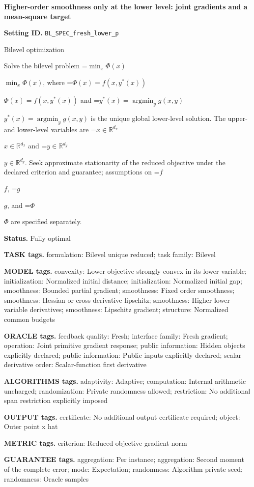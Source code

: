 \documentclass[10pt,a4paper]{article}
\newcommand{\AtlasMath}[1]{\par\begingroup\centering\setbox0=\hbox{$\displaystyle #1$}\ifdim\wd0>1.4\linewidth\typeout{ATLAS WIDE FORMULA: \the\wd0}\fi\ifdim\wd0>\linewidth\resizebox{\linewidth}{!}{\box0}\else\box0\fi\par\endgroup}
\newcommand{\AtlasInlineMath}[1]{\begingroup\setbox0=\hbox{$#1$}\ifdim\wd0>.4\linewidth\endgroup\AtlasMath{#1}\else\endgroup$#1$\fi}
\begin{document}
\raggedright

{\LARGE\bfseries\sffamily\color{AtlasNavy} Higher-order smoothness only at the lower level: joint gradients and a mean-square target\par}\vspace{5pt}
\textbf{Setting ID.} \texttt{BL\_\allowbreak{}SPEC\_\allowbreak{}fresh\_\allowbreak{}lower\_\allowbreak{}p}

Bilevel optimization

Solve the bilevel problem \AtlasInlineMath{\min_x\Phi(x)}, where \AtlasInlineMath{\Phi(x)=f(x,y^*(x))} and \AtlasInlineMath{y^*(x)=\operatorname*{argmin}_y g(x,y)} is the unique global lower-level solution. The upper- and lower-level variables are \AtlasInlineMath{x\in\mathbb{R}^{d_x}} and \AtlasInlineMath{y\in\mathbb{R}^{d_y}}. Seek approximate stationarity of the reduced objective under the declared criterion and guarantee; assumptions on \AtlasInlineMath{f}, \AtlasInlineMath{g}, and \AtlasInlineMath{\Phi} are specified separately.

\textbf{Status.} Fully optimal

\textbf{TASK tags.} formulation: Bilevel unique reduced; task family: Bilevel

\textbf{MODEL tags.} convexity: Lower objective strongly convex in its lower variable; initialization: Normalized initial distance; initialization: Normalized initial gap; smoothness: Bounded partial gradient; smoothness: Fixed order smoothness; smoothness: Hessian or cross derivative lipschitz; smoothness: Higher lower variable derivatives; smoothness: Lipschitz gradient; structure: Normalized common budgets

\textbf{ORACLE tags.} feedback quality: Fresh; interface family: Fresh gradient; operation: Joint primitive gradient response; public information: Hidden objects explicitly declared; public information: Public inputs explicitly declared; scalar derivative order: Scalar-function first derivative

\textbf{ALGORITHMS tags.} adaptivity: Adaptive; computation: Internal arithmetic uncharged; randomization: Private randomness allowed; restriction: No additional span restriction explicitly imposed

\textbf{OUTPUT tags.} certificate: No additional output certificate required; object: Outer point x hat

\textbf{METRIC tags.} criterion: Reduced-objective gradient norm

\textbf{GUARANTEE tags.} aggregation: Per instance; aggregation: Second moment of the complete error; mode: Expectation; randomness: Algorithm private seed; randomness: Oracle samples
\end{document}
